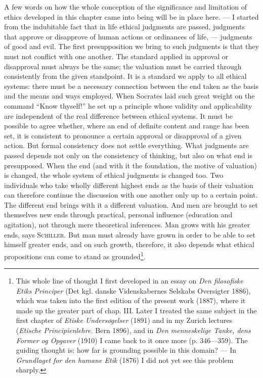 \documentclass[12pt,a4paper,openany]{book}
\newcommand{\opage}[1]{\marginnote{\footnotesize\textit{[#1]}}}
\begin{document}
A few words on how the whole conception of the significance and limitation of ethics developed in
this chapter came into being will be in place here. --- I started from the indubitable fact that in
life ethical judgments are passed, judgments that approve or disapprove of human actions or ordinances
of life, --- judgments of good and evil. The first presupposition we bring to such judgments is that
they must not
\opage{50}conflict with one another. The standard applied in approval or disapproval must always be the same;
the valuation must be carried through consistently from the given standpoint. It is a standard we
apply to all ethical systems: there must be a necessary connection between the end taken as the basis
and the means and ways employed. When Socrates laid such great weight on the command ``Know
thyself!'' he set up a principle whose validity and applicability are independent of the real
difference between ethical systems. It must be possible to agree whether, where an end of definite
content and range has been set, it is consistent to pronounce a certain approval or disapproval of a
given action. But formal consistency does not settle everything. What judgments are passed depends
not only on the consistency of thinking, but also on what end is presupposed. When the end (and with
it the foundation, the motive of valuation) is changed, the whole system of ethical judgments is
changed too. Two individuals who take wholly different highest ends as the basis of their valuation
can therefore continue the discussion with one another only up to a certain point. The different end
brings with it a different valuation. And men are brought to set themselves new ends through
practical, personal influence (education and agitation), not through mere theoretical inferences. Man
grows with his greater ends, says \textsc{Schiller}. But man must already have grown in order to be
able to set himself greater ends, and on such growth, therefore, it also depends what ethical
propositions can come to stand as grounded\footnote[1]{This whole line of thought I first developed
in an essay on \textit{Den filosofiske Etiks Principer} (Det kgl. danske Videnskabernes Selskabs
Oversigter 1886), which was taken into the first edition of the present work (1887), where it made up
the greater part of chap. III. Later I treated the same subject in the first chapter of
\textit{Etiske Undersøgelser} (1891) and in my Zurich lectures (\textit{Etische Principienlehre.}
Bern 1896), and in \textit{Den menneskelige Tanke, dens Former og Opgaver} (1910) I came back to it
once more (p. 346---359). The guiding thought is: how far is grounding possible in this domain? ---
In \textit{Grundlaget for den humane Etik} (1876) I did not yet see this problem sharply.}.
\end{document}
